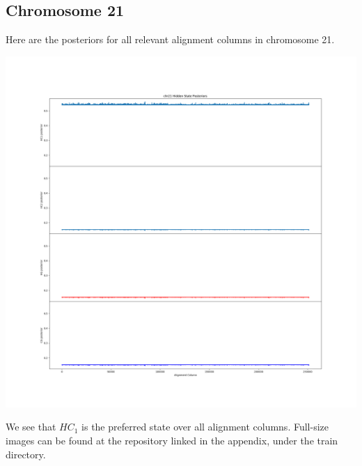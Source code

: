 \documentclass[12pt]{article}
\begin{document}
        \subsection{Chromosome 21}
        Here are the posteriors for all relevant alignment columns in chromosome 21.
        {\centering\includegraphics[width=1.\textwidth]{train/chr21_posteriors}\par}
        We see that $HC_1$ is the preferred state over all alignment columns. Full-size images can be found at the repository linked in the appendix, under the train directory.
\end{document}
